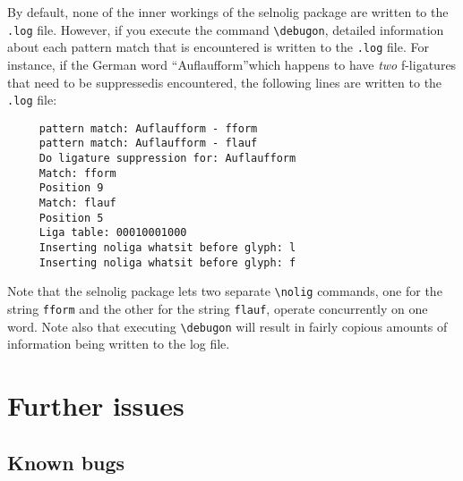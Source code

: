 \documentclass[12pt]{article}
\newcommand{\pkg}[1]{\textsf{#1}}
\newcommand{\opt}[1]{\texttt{#1}}
\newcommand{\cmmd}[1]{\texttt{\textbackslash #1}}
\begin{document}
By default, none of the inner workings of the \pkg{selnolig} package are written to the \opt{.log} file. However, if you execute the command \cmmd{debugon}, detailed information about each pattern match that is encountered is written to the \opt{.log} file. For instance, if the German word \enquote{Auflaufform}\textemdash which happens to have \emph{two} f-ligatures that need to be suppressed\textemdash is encountered, the following lines are written to the \opt{.log} file:
\begin{Verbatim}
     pattern match: Auflaufform - fform
     pattern match: Auflaufform - flauf
     Do ligature suppression for: Auflaufform
     Match: fform
     Position 9
     Match: flauf
     Position 5
     Liga table: 00010001000
     Inserting noliga whatsit before glyph: l
     Inserting noliga whatsit before glyph: f
\end{Verbatim}
Note that the \pkg{selnolig} package lets two separate \cmmd{nolig} commands, one for the string \opt{fform} and the other for the string \opt{flauf}, operate concurrently on one word. Note also that executing \cmmd{debugon} will result in fairly copious amounts of information being written to the log file.



\section{Further issues}

\subsection{Known bugs}
\end{document}
